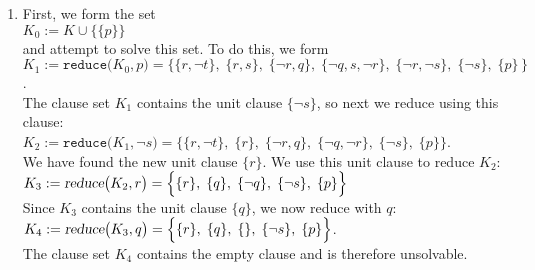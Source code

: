 \begin{enumerate}
\item First, we form the set \\[0.2cm]
      \hspace*{1.3cm} $K_0 := K \cup \bigl\{ \{p\} \bigr\}$       \\[0.2cm]
      and attempt to solve this set. To do this, we form \\[0.2cm]
      \hspace*{0.3cm} 
      $K_1 := \texttt{reduce}\bigl(K_0,p\bigr) = 
          \Big\{ \{r, \neg t\},\; \{r, s\},\; \{\neg r, q\},\; \{\neg q, s, \neg r\},\; \{\neg r, \neg s\},\; \{ \neg s\},\;\{p\}\, \Big\}$.
      \\[0.2cm]
      The clause set $K_1$ contains the unit clause $\{\neg s\}$,
      so next we reduce using this clause: \\[0.2cm]
      \hspace*{1.3cm} 
      $K_2 := \texttt{reduce}\bigl(K_1,\neg s\bigr) = 
              \Big\{ \{r, \neg t\},\; \{r\},\; \{\neg r, q\},\; \{\neg q, \neg r\},\; \{ \neg s\},\; \{p\} \Big\}$.
      \\[0.2cm]
      We have found the new unit clause $\{r\}$.  We use this unit clause to reduce $K_2$:
      \\[0.2cm]
      \hspace*{1.3cm} 
      $K_3 := \textsl{reduce}\bigl(K_2, r\bigr) = 
              \Big\{ \{r\},\; \{q\},\; \{\neg q\},\; \{ \neg s\},\; \{p\} \Big\}$
      \\[0.2cm]
      Since $K_3$ contains the unit clause $\{q\}$, we now reduce with $q$:
      \\[0.2cm]
      \hspace*{1.3cm} 
      $K_4 := \textsl{reduce}\bigl(K_3, q\bigr) = 
              \Big\{ \{r\},\; \{q\},\; \{\},\; \{ \neg s\},\; \{p\} \Big\}$.
      \\[0.2cm]
      The clause set $K_4$ contains the empty clause and is therefore unsolvable.
     

\end{enumerate}

